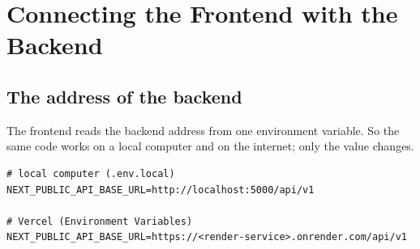 \documentclass[11pt,a4paper]{article}
\begin{document}
\section{Connecting the Frontend with the Backend}
\subsection{The address of the backend}
The frontend reads the backend address from one environment variable. So the same code works on a local computer and on the internet; only the value changes.
\begin{lstlisting}[style=query]
# local computer (.env.local)
NEXT_PUBLIC_API_BASE_URL=http://localhost:5000/api/v1

# Vercel (Environment Variables)
NEXT_PUBLIC_API_BASE_URL=https://<render-service>.onrender.com/api/v1
\end{lstlisting}
\end{document}

